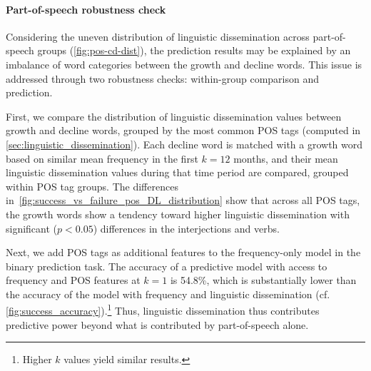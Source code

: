 \paragraph{Part-of-speech robustness check}

Considering the uneven distribution of linguistic dissemination across part-of-speech groups (\autoref{fig:pos-cd-dist}), the prediction results may be explained by an imbalance of word categories between the growth and decline words.
This issue is addressed through two robustness checks: within-group comparison and prediction.

First, we compare the distribution of linguistic dissemination values between growth and decline words, grouped by the most common POS tags (computed in \autoref{sec:linguistic_dissemination}).
Each decline word is matched with a growth word based on similar mean frequency in the first $k=12$ months, and their mean linguistic dissemination values during that time period are compared, grouped within POS tag groups.
The differences in~\autoref{fig:success_vs_failure_pos_DL_distribution} show that across all POS tags, the growth words show a tendency toward higher linguistic dissemination with significant ($p<0.05$) differences in the interjections and verbs.

Next, we add POS tags as additional features to the frequency-only model in the binary prediction task.
The accuracy of a predictive model with access to frequency and POS features at ${k=1}$ is 54.8\%, which is substantially lower than the accuracy of the model with frequency and linguistic dissemination (cf. \autoref{fig:success_accuracy}).\footnote{Higher $k$ values yield similar results.}
Thus, linguistic dissemination thus contributes predictive power beyond what is contributed by part-of-speech alone.

